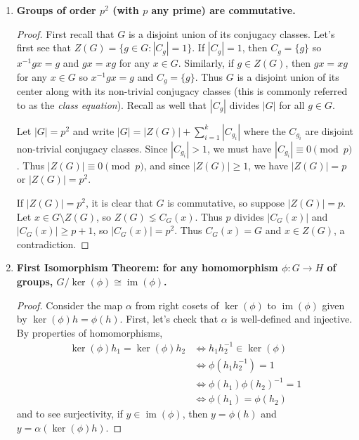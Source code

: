 \documentclass[12pt, a4paper]{article}
\DeclareMathOperator{\im}{im}
\theoremstyle{nonumberplain}
\newtheorem{proof}{Proof}
\begin{document}
\begin{enumerate}
\begin{proof}
            Thus $h=(g^n)^k\in\langle g^n\rangle$ so $H\subseteq\langle g^n\rangle$ and equality holds, as desired.
        \end{proof}
    \item \textbf{Groups of order $p^2$ (with $p$ any prime) are commutative.}
        \begin{proof}
            First recall that $G$ is a disjoint union of its conjugacy classes.
            Let's first see that $Z(G)=\{g\in G:|C_g|=1\}$.
            If $|C_g|=1$, then $C_g=\{g\}$ so $x^{-1}gx=g$ and $gx=xg$ for any $x\in G$.
            Similarly, if $g\in Z(G)$, then $gx=xg$ for any $x\in G$ so $x^{-1}gx=g$ and $C_g=\{g\}$.
            Thus $G$ is a disjoint union of its center along with its non-trivial conjugacy classes (this is commonly referred to as the \textit{class equation}).
            Recall as well that $|C_g|$ divides $|G|$ for all $g\in G$.

            Let $|G|=p^2$ and write $|G|=|Z(G)|+\sum_{i=1}^k |C_{g_i}|$ where the $C_{g_i}$ are disjoint non-trivial conjugacy classes.
            Since $|C_{g_i}|>1$, we must have $|C_{g_i}|\equiv 0\pmod{p}$.
            Thus $|Z(G)|\equiv 0\pmod{p}$, and since $|Z(G)|\geq 1$, we have $|Z(G)|=p$ or $|Z(G)|=p^2$.

            If $|Z(G)|=p^2$, it is clear that $G$ is commutative, so suppose $|Z(G)|=p$.
            Let $x\in G\setminus Z(G)$, so $Z(G)\lneq C_G(x)$.
            Thus $p$ divides $|C_G(x)|$ and $|C_G(x)|\geq p+1$, so $|C_G(x)|=p^2$.
            Thus $C_G(x)=G$ and $x\in Z(G)$, a contradiction.
        \end{proof}
    \item \textbf{First Isomorphism Theorem: for any homomorphism $\phi:G\to H$ of groups, $G/\ker(\phi)\cong\im(\phi)$.}
        \begin{proof}
            Consider the map $\alpha$ from right cosets of $\ker(\phi)$ to $\im(\phi)$ given by $\ker(\phi)h=\phi(h)$.
            First, let's check that $\alpha$ is well-defined and injective.
            By properties of homomorphisms,
            \begin{align*}
                \ker(\phi)h_1=\ker(\phi)h_2 &\Longleftrightarrow h_1h_2^{-1}\in\ker(\phi)\\
                                            &\Longleftrightarrow \phi(h_1h_2^{-1})=1\\
                                            &\Longleftrightarrow \phi(h_1)\phi(h_2)^{-1}=1\\
                                            &\Longleftrightarrow \phi(h_1)=\phi(h_2)
            \end{align*}
            and to see surjectivity, if $y\in\im(\phi)$, then $y=\phi(h)$ and $y=\alpha(\ker(\phi)h)$.


\end{proof}
\end{enumerate}
\end{document}
